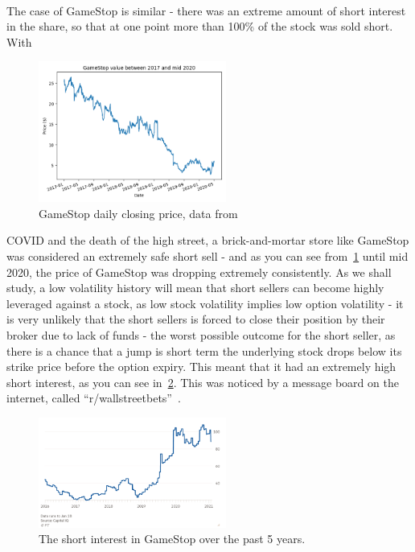 \documentclass[11pt]{article} %
\begin{document}
\paragraph{}
The case of GameStop is similar - there was an extreme amount of short interest in 
the share, so that at one point more than 100\% of the stock was sold short. With 
\begin{figure}[h]
    \centering
    \includegraphics[width=0.55\textwidth]{gameStopPriorValue.png}
    \caption{GameStop daily closing price, data from~\cite{nasdaq} }\label{gamestopprice}
    \end{figure}
    COVID and the death of the high street, a brick-and-mortar store like GameStop was 
considered an extremely safe short sell - and as you can see from~\ref{gamestopprice}  
until mid 2020, the price of GameStop was dropping extremely consistently. As we shall study, 
a low volatility history will mean that short sellers can become highly leveraged against a 
stock, as low stock volatility implies low option volatility - it is very unlikely that 
the short sellers is forced to close their position by their broker due to lack of funds - 
the worst possible outcome for the short seller, as there is a chance that a jump is short 
term the underlying stock drops below its strike price before the option expiry. This  
meant that it had an extremely high short interest, as you can see in~\ref{shortinterest}. 
This was noticed by a message board on the internet, called ``r/wallstreetbets''~\cite{wsb}. 
\begin{figure}[h]
    \centering
    \includegraphics[width=0.55\textwidth]{shortinterest.png}
    \caption{The short interest in GameStop over the past 5 years.}\label{shortinterest}
    \end{figure}
\end{document}
